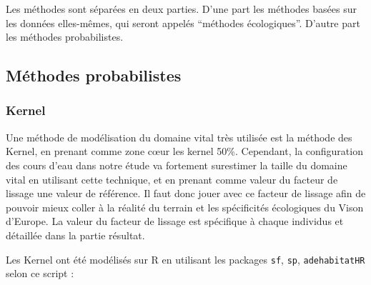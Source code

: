 \documentclass[
  letterpaper,
  DIV=11,
  numbers=noendperiod]{scrreprt}
\begin{document}
Les méthodes sont séparées en deux parties. D'une part les méthodes
basées sur les données elles-mêmes, qui seront appelés ``méthodes
écologiques''. D'autre part les méthodes probabilistes.

\subsection{Méthodes probabilistes}\label{muxe9thodes-probabilistes}

\subsubsection{Kernel}\label{kernel}

Une méthode de modélisation du domaine vital très utilisée est la
méthode des Kernel, en prenant comme zone cœur les kernel 50\%.
Cependant, la configuration des cours d'eau dans notre étude va
fortement surestimer la taille du domaine vital en utilisant cette
technique, et en prenant comme valeur du facteur de lissage une valeur
de référence. Il faut donc jouer avec ce facteur de lissage afin de
pouvoir mieux coller à la réalité du terrain et les spécificités
écologiques du Vison d'Europe. La valeur du facteur de lissage est
spécifique à chaque individus et détaillée dans la partie résultat.

Les Kernel ont été modélisés sur R en utilisant les packages
\texttt{sf}, \texttt{sp}, \texttt{adehabitatHR} selon ce script :
\end{document}
